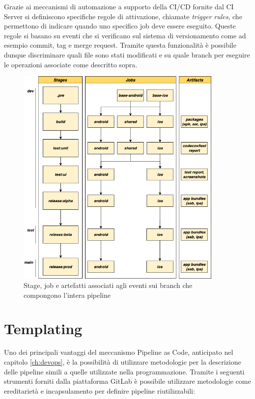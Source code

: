 Grazie ai meccanismi di automazione a supporto della CI/CD fornite dal CI Server si definiscono specifiche regole di attivazione, chiamate \textit{trigger rules}, che permettono di indicare quando uno specifico job deve essere eseguito. Queste regole si basano su eventi che si verificano sul sistema di versionamento come ad esempio commit, tag e merge request. Tramite questa funzionalità è possibile dunque discriminare quali file sono stati modificati e su quale branch per eseguire le operazioni associate come descritto sopra.

\begin{figure}[H]
    \centering
    \includegraphics[width=0.9\textwidth]{img/cicd-branch-jobs.png}
    \caption{Stage, job e artefatti associati agli eventi sui branch che compongono l'intera pipeline}
    \label{pipeline-branches}
\end{figure}

\section{Templating}
Uno dei principali vantaggi del meccanismo Pipeline as Code, anticipato nel capitolo \ref{ch:devops}, è la possibilità di utilizzare metodologie per la descrizione delle pipeline simili a quelle utilizzate nella programmazione. Tramite i seguenti strumenti forniti dalla piattaforma GitLab è possibile utilizzare metodologie come ereditarietà e incapsulamento per definire pipeline riutilizzabili:

